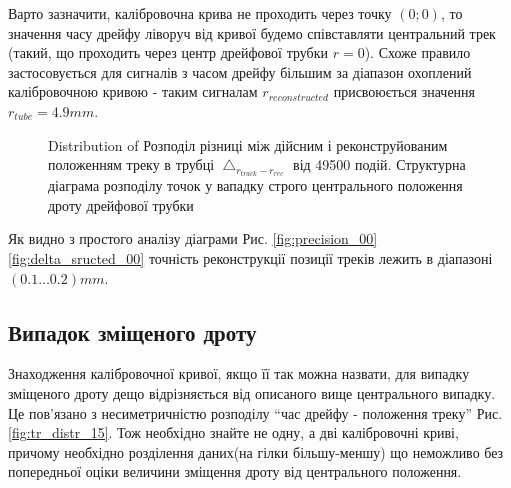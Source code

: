 \documentclass[]{article}
\begin{document}
	Варто зазначити, калібровочна крива не проходить через точку $(0;0)$, то значення часу дрейфу ліворуч від кривої будемо співставляти центральний трек (такий, що проходить через центр дрейфової трубки $r=0$). Схоже правило застосовується для сигналів з часом дрейфу більшим за діапазон охоплений калібровочною кривою - таким сигналам $r_{reconstructed}$ присвоюється значення $r_{tube} = 4.9mm$.
	
	\begin{figure}[h]
	\centering
		\qquad
		\caption{Distribution of Розподіл різниці між дійсним і реконструйованим положенням треку в трубці $\bigtriangleup_{r_{track} - r_{rec}}$ від 49500 подій. Структурна діаграма розподілу точок у вападку строго центрального положення дроту дрейфової трубки}
	\end{figure}
	
	Як видно з простого аналізу діаграми Рис. \ref{fig:precision_00} \ref{fig:delta_sructed_00} точність реконструкції позиції треків лежить в діапазоні $(0.1 \dots 0.2) mm$. 
	
	\subsection{Випадок зміщеного дроту}
	Знаходження калібровочної кривої, якщо її так можна назвати, для випадку зміщеного дроту дещо відрізняється від описаного вище центрального випадку. Це пов’язано з несиметричністю розподілу ``час дрейфу - положення треку'' Рис. \ref{fig:tr_distr_15}. Тож необхідно знайте не одну, а дві калібровочні криві, причому необхідно розділення даних(на гілки більшу-меншу) що неможливо без попередньої оціки величини зміщення дроту від центрального положення.
	
\end{document}
